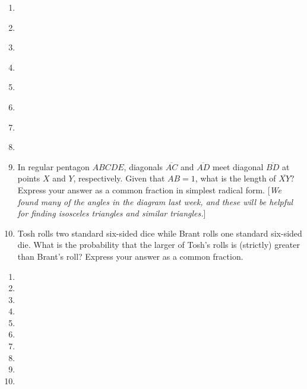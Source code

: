 \documentclass{article}
\begin{document}
\begin{enumerate}
\item \underline{\hspace{3in}}\vspace{1cm}
\item \underline{\hspace{3in}}\vspace{1cm}
\item \underline{\hspace{3in}}\vspace{1cm}
\item \underline{\hspace{3in}}\vspace{1cm}
\item \underline{\hspace{3in}}\vspace{1cm}
\item \underline{\hspace{3in}}\vspace{1cm}
\item \underline{\hspace{3in}}\vspace{1cm}
\item \underline{\hspace{3in}}\vspace{1cm}
\item In regular pentagon $ABCDE$, diagonals $\overline{AC}$ and $\overline{AD}$ meet diagonal $\overline{BD}$ at points $X$ and $Y$, respectively. Given that $AB = 1$, what is the length of $\overline{XY}$? Express your answer as a common fraction in simplest radical form. [\emph{We found many of the angles in the diagram last week, and these will be helpful for finding isosceles triangles and similar triangles.}]
\vspace{1cm}
\item Tosh rolls two standard six-sided dice while Brant rolls one standard six-sided die. What is the probability that the larger of Tosh's rolls is (strictly) greater than Brant's roll? Express your answer as a common fraction.
\end{enumerate}


\newpage

\begin{enumerate}
\item 
\item 
\item 
\item 
\item 
\item 
\item 
\item 
\item 
\item 
\end{enumerate}
\end{document}
